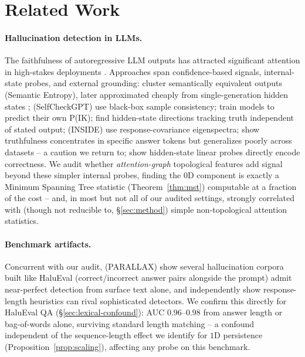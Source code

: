 
\section{Related Work}
\label{sec:related}

\paragraph{Hallucination detection in LLMs.}
The faithfulness of autoregressive LLM outputs has attracted significant attention in high-stakes deployments \citep{huang2023survey, ji2023survey}. Approaches span confidence-based signals, internal-state probes, and external grounding: \citet{farquhar2024semantic} cluster semantically equivalent outputs (Semantic Entropy), later approximated cheaply from single-generation hidden states \citep{kossen2024semantic}; \citet{manakul2023selfcheckgpt} (SelfCheckGPT) use black-box sample consistency; \citet{kadavath2022know} train models to predict their own P(IK); \citet{burns2022discovering,marks2023geometry} find hidden-state directions tracking truth independent of stated output; \citet{chen2024inside} (INSIDE) use response-covariance eigenspectra; \citet{orgad2024llms} show truthfulness concentrates in specific answer tokens but generalizes poorly across datasets -- a caution we return to; \citet{azaria2023internal,chuang2024lookback} show hidden-state linear probes directly encode correctness. We audit whether \emph{attention-graph} topological features add signal beyond these simpler internal probes, finding the $0$D component is exactly a Minimum Spanning Tree statistic (Theorem~\ref{thm:mst}) computable at a fraction of the cost -- and, in most but not all of our audited settings, strongly correlated with (though not reducible to, \S\ref{sec:method}) simple non-topological attention statistics.

\paragraph{Benchmark artifacts.} Concurrent with our audit, \citet{hussain2026parallax} (PARALLAX) show several hallucination corpora built like HaluEval (correct/incorrect answer pairs alongside the prompt) admit near-perfect detection from surface text alone, and \citet{janiak2025illusion} independently show response-length heuristics can rival sophisticated detectors. We confirm this directly for HaluEval QA (\S\ref{sec:lexical-confound}): AUC $0.96$--$0.98$ from answer length or bag-of-words alone, surviving standard length matching -- a confound independent of the sequence-length effect we identify for $1$D persistence (Proposition~\ref{prop:scaling}), affecting any probe on this benchmark.

